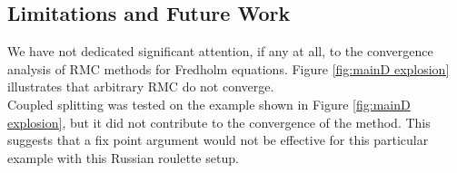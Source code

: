 \documentclass[a4paper,12pt]{article}
\begin{document}
\begin{pythonn} \label{py:nonlinear RRMC IVP}
\end{pythonn}






\subsection{Limitations and Future Work}

We have not dedicated significant attention, if any at all, to
the convergence analysis of RMC methods
for Fredholm equations. Figure \ref{fig:mainD explosion} illustrates
that arbitrary RMC do not converge. \\

Coupled splitting was tested on the example shown in Figure
\ref{fig:mainD explosion}, but it did not contribute to the
convergence of the method. This suggests that a fix point argument
would not be effective for this particular example with this
Russian roulette setup. \\
\end{document}
